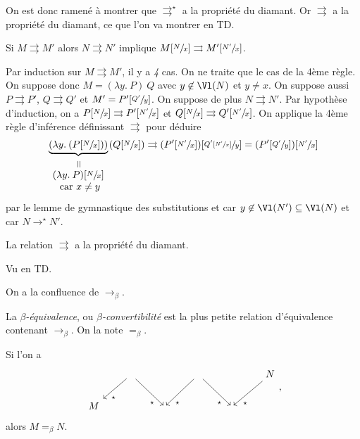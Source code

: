 \documentclass{../notes}
\let\rpar\rightrightarrows
\begin{document}
  On est donc ramené à montrer que $\rpar^\star$ a la propriété du diamant.
  Or $\rpar$ a la propriété du diamant, ce que l'on va montrer en TD.

  \begin{lem}
    Si $M \rpar M'$ alors  $N \rpar N'$ implique  $M[\sfrac{N}{x}] \rpar M'[\sfrac{N'}{x}]$.
  \end{lem}
  \begin{prv}
    Par induction sur $M \rpar M'$, il y a  \textit{4} cas.
    On ne traite que le cas de la 4ème règle.
    On suppose donc $M = (\lambda y.\: P)\: Q$ avec $y \not\in \Vl(N)$ et $y \neq x$.
    On suppose aussi $P \rpar P'$,  $Q \rpar Q'$ et $M' = P'[\sfrac{Q'}{y}]$.
    On suppose de plus $N \rpar N'$.
    Par hypothèse d'induction, on a $P[\sfrac{N}{x}] \rpar P'[\sfrac{N'}{x}]$ et $Q[\sfrac{N}{x}] \rpar Q'[\sfrac{N'}{x}]$.
    On applique la 4ème règle d'inférence définissant $\rpar$ pour déduire 
     \[
       \underbrace{(\lambda y. \: (P[\sfrac{N}{x}]))}_{
         \begin{array}{c}
           \vertical = \\
            (\lambda y.\: P)[\sfrac{N}{x}]\\
            \text{ car } x  \neq y
         \end{array}
       } (Q[\sfrac{N}{x}]) \rpar 
       (P'[\sfrac{N'}{x}])[\sfrac{Q'[\sfrac{N'}{x}]}{y}] = (P'[\sfrac{Q'}{y}])[\sfrac{N'}{x}]
    \]
    par le lemme de gymnastique des substitutions et car $y \not\in  \Vl(N') \subseteq \Vl(N)$ et car $N \to^\star N'$.
  \end{prv}

  \begin{prop}
    La relation $\rpar$ a la propriété du diamant.
  \end{prop}
  \begin{prv}
    Vu en TD.
  \end{prv}

  \begin{crlr}
    On a la confluence de $\to_\beta$.
  \end{crlr}

  \begin{defn}
    La \textit{$\beta$-équivalence}, ou \textit{$\beta$-convertibilité} est la plus petite relation d'équivalence contenant $\to_\beta$.
    On la note $=_\beta$.

    Si l'on a \[
    \begin{tikzcd}
      & \arrow[near end]{dl}{\star} \arrow[swap,near end]{dr}{\star} & &  \arrow[near end]{dl}{\star} \arrow[swap,near end]{dr}{\star} & &  \arrow[near end]{dl}{\star} N \\
      M &  & ~ & & ~ &
    \end{tikzcd}
    ,\] 
    alors $M =_\beta N$.
  \end{defn}
\end{document}
